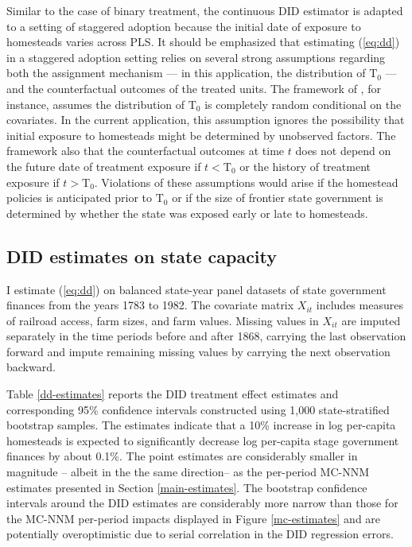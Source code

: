 \documentclass[hidelinks,12pt]{article}
\begin{document}
Similar to the case of binary treatment, the continuous DID estimator is adapted to a setting of staggered adoption because the initial date of exposure to homesteads varies across PLS. It should be emphasized that estimating (\ref{eq:dd}) in a staggered adoption setting relies on several strong assumptions regarding both the assignment mechanism --- in this application, the distribution of $\text{T}_0$ --- and the counterfactual outcomes of the treated units. The framework of \citet{athey2018design}, for instance, assumes the distribution of $\text{T}_0$ is completely random conditional on the covariates. In the current application, this assumption ignores the possibility that initial exposure to homesteads might be determined by unobserved factors. The framework also that the counterfactual outcomes at time $t$ does not depend on the future date of treatment exposure if $t <  \text{T}_0$ or the history of treatment exposure if $t >  \text{T}_0$. Violations of these assumptions would arise if the homestead policies is anticipated prior to $\text{T}_0$ or if the size of frontier state government is determined by whether the state was exposed early or late to homesteads. 

\subsection{DID estimates on state capacity}

I estimate (\ref{eq:dd}) on balanced state-year panel datasets of state government finances from the years 1783 to 1982. The covariate matrix $X_{it}$ includes measures of railroad access, farm sizes, and farm values. Missing values in $X_{it}$ are imputed separately in the time periods before and after 1868, carrying the last observation forward and impute remaining missing values by carrying the next observation backward.

Table \ref{dd-estimates} reports the DID treatment effect estimates and corresponding 95\% confidence intervals constructed using 1,000 state-stratified bootstrap samples. The estimates indicate that a 10\% increase in log per-capita homesteads is expected to significantly decrease log per-capita stage government finances by about 0.1\%. The point estimates are considerably smaller in magnitude -- albeit in the the same direction-- as the per-period MC-NNM estimates presented in Section \ref{main-estimates}. The bootstrap confidence intervals around the DID estimates are considerably more narrow than those for the MC-NNM per-period impacts displayed in Figure \ref{mc-estimates} and are potentially overoptimistic due to serial correlation in the DID regression errors.
\end{document}
